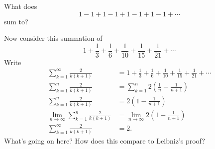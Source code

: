 \documentclass{ximera}
\begin{document}
\begin{question}
What does
\[
1-1+1-1+1-1+1-1+\cdots
\]
sum to?
\end{question}

\begin{question}
Now consider this summation of 
\[
1+ \frac{1}{3} + \frac{1}{6} + \frac{1}{10} + \frac{1}{15} + \frac{1}{21} + \cdots
\]
Write
\begin{align*}
\sum_{k=1}^\infty \frac{2}{k(k+1)} &= 1+ \frac{1}{3} + \frac{1}{6} + \frac{1}{10} + \frac{1}{15} + \frac{1}{21} + \cdots \\
\sum_{k=1}^n \frac{2}{k(k+1)} &= \sum_{k=1}^n 2\left(\frac{1}{n}- \frac{1}{n+1}\right)\\
\sum_{k=1}^n \frac{2}{k(k+1)} &= 2\left(1 - \frac{1}{n+1}\right)\\
\lim_{n\to \infty} \sum_{k=1}^n \frac{2}{k(k+1)} &= \lim_{n\to \infty}2\left(1 - \frac{1}{n+1}\right)\\
\sum_{k=1}^\infty \frac{2}{k(k+1)} &= 2.
\end{align*}
What's going on here? How does this compare to Leibniz's proof?
\end{question}

\end{document}
